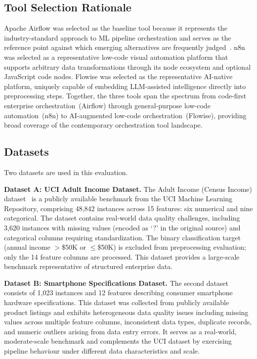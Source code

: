 \documentclass[journal]{IEEEtran}
\begin{document}
\subsection{Tool Selection Rationale}

Apache Airflow was selected as the baseline tool because it represents
the industry-standard approach to ML pipeline orchestration and serves as
the reference point against which emerging alternatives are frequently
judged~\cite{kreuzberger2023mlops}. n8n was selected as a representative
low-code visual automation platform that supports arbitrary data
transformations through its node ecosystem and optional JavaScript code
nodes. Flowise was selected as the representative AI-native platform,
uniquely capable of embedding LLM-assisted intelligence directly into
preprocessing steps. Together, the three tools span the spectrum from
code-first enterprise orchestration~(Airflow) through general-purpose
low-code automation~(n8n) to AI-augmented low-code orchestration~(Flowise),
providing broad coverage of the contemporary orchestration tool landscape.

\subsection{Datasets}

Two datasets are used in this evaluation.

\textbf{Dataset A: UCI Adult Income Dataset.} The Adult Income (Census
Income) dataset~\cite{adultincome} is a publicly available benchmark from
the UCI Machine Learning Repository, comprising 48,842 instances across
15 features: six numerical and nine categorical. The dataset contains
real-world data quality challenges, including 3,620 instances with missing
values (encoded as `?' in the original source) and categorical columns
requiring standardization. The binary classification target (annual income
$>$\$50K or $\leq$\$50K) is excluded from preprocessing evaluation;
only the 14 feature columns are processed. This dataset provides a
large-scale benchmark representative of structured enterprise data.

\textbf{Dataset B: Smartphone Specifications Dataset.} The second dataset
consists of 1,023 instances and 12 features describing consumer smartphone
hardware specifications. This dataset was collected from publicly available
product listings and exhibits heterogeneous data quality issues including
missing values across multiple feature columns, inconsistent data types,
duplicate records, and numeric outliers arising from data entry errors.
It serves as a real-world, moderate-scale benchmark and complements the
UCI dataset by exercising pipeline behaviour under different data
characteristics and scale.
\end{document}
